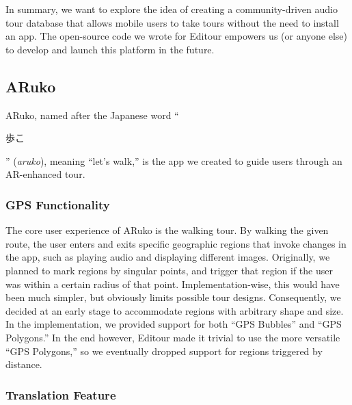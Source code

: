 \documentclass[a4paper, 10pt, american, titlepage]{article}
\begin{document}
In summary, we want to explore the idea of creating a community-driven audio
tour database that allows mobile users to take tours without the need to install
an app. The open-source code we wrote for Editour empowers us (or anyone else)
to develop and launch this platform in the future.

\subsection{ARuko}
\label{sec:aruko}

ARuko, named after the Japanese word ``\begin{CJK}{UTF8}{min}歩こ\end{CJK}''
(\textit{aruko}), meaning ``let's walk,'' is the app we created to guide users
through an AR-enhanced tour.

\subsubsection{GPS Functionality}
\label{sec:gpsFunctionality}

The core user experience of ARuko is the walking tour. By walking the given
route, the user enters and exits specific geographic regions that invoke
changes in the app, such as playing audio and displaying different images.
Originally, we planned to mark regions by singular points, and trigger that
region if the user was within a certain radius of that point.
Implementation-wise, this would have been much simpler, but obviously limits
possible tour designs. Consequently, we decided at an early stage to
accommodate regions with arbitrary shape and size.  In the implementation, we
provided support for both ``GPS Bubbles'' and ``GPS Polygons.'' In the end
however, Editour made it trivial to use the more versatile ``GPS Polygons,'' so
we eventually dropped support for regions triggered by distance.

\subsubsection{Translation Feature}
\label{sec:translationFeature}
\end{document}
